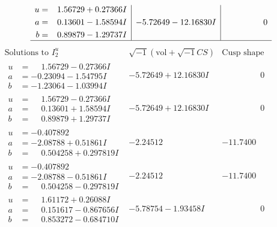 \documentclass[1p]{elsarticle_modified}
\theoremstyle{definition}
\newcommand{\I}{\sqrt{-1}}
\begin{document}
$$\begin{array}{c|c|c}
\begin{aligned}
u &= \phantom{-}1.56729 + 0.27366 I \\
a &= \phantom{-}0.13601 - 1.58594 I \\
b &= \phantom{-}0.89879 - 1.29737 I\end{aligned}
 & -5.72649 - 12.16830 I & \phantom{-0.000000 } 0\\
 \hline 
 \end{array}$$\newpage$$\begin{array}{c|c|c}  
\text{Solutions to }I^u_{2}& \I (\text{vol} + \sqrt{-1}CS) & \text{Cusp shape}\\
 \hline 
\begin{aligned}
u &= \phantom{-}1.56729 - 0.27366 I \\
a &= -0.23094 - 1.54795 I \\
b &= -1.23064 - 1.03994 I\end{aligned}
 & -5.72649 + 12.16830 I & \phantom{-0.000000 } 0 \\ \hline\begin{aligned}
u &= \phantom{-}1.56729 - 0.27366 I \\
a &= \phantom{-}0.13601 + 1.58594 I \\
b &= \phantom{-}0.89879 + 1.29737 I\end{aligned}
 & -5.72649 + 12.16830 I & \phantom{-0.000000 } 0 \\ \hline\begin{aligned}
u &= -0.407892\phantom{ +0.000000I} \\
a &= -2.08788 + 0.51861 I \\
b &= \phantom{-}0.504258 + 0.297819 I\end{aligned}
 & -2.24512\phantom{ +0.000000I} & -11.7400\phantom{ +0.000000I} \\ \hline\begin{aligned}
u &= -0.407892\phantom{ +0.000000I} \\
a &= -2.08788 - 0.51861 I \\
b &= \phantom{-}0.504258 - 0.297819 I\end{aligned}
 & -2.24512\phantom{ +0.000000I} & -11.7400\phantom{ +0.000000I} \\ \hline\begin{aligned}
u &= \phantom{-}1.61172 + 0.26088 I \\
a &= \phantom{-}0.151617 - 0.867656 I \\
b &= \phantom{-}0.853272 - 0.684710 I\end{aligned}
 & -5.78754 - 1.93458 I & \phantom{-0.000000 } 0 \\ \hline\begin{aligned}

\end{aligned}
\end{array}$$
\end{document}
